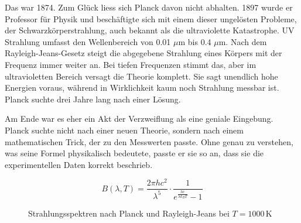 	Das war 1874. 
	Zum Glück liess sich Planck davon nicht abhalten.
	1897 wurde er Professor für Physik und beschäftigte sich mit einem dieser ungelösten Probleme, der Schwarzkörperstrahlung, auch bekannt als die ultraviolette Katastrophe. 
	UV Strahlung umfasst den Wellenbereich von 0.01 $\mu$m bis 0.4 $\mu$m.
	Nach dem Rayleigh-Jeans-Gesetz steigt die abgegebene Strahlung eines Körpers mit der Frequenz immer weiter an. Bei tiefen Frequenzen stimmt das, aber im ultravioletten Bereich versagt die Theorie komplett. 
	Sie sagt unendlich hohe Energien voraus, während in Wirklichkeit kaum noch Strahlung messbar ist.
	Planck suchte drei Jahre lang nach einer Lösung. 
	
	
	Am Ende war es eher ein Akt der Verzweiflung als eine geniale Eingebung. 
	Planck suchte nicht nach einer neuen Theorie, sondern nach einem mathematischen Trick, der zu den Messwerten passte.
	Ohne genau zu verstehen, was seine Formel physikalisch bedeutete, passte er sie so an, dass sie die experimentellen Daten korrekt beschrieb. 


	\begin{equation}
		B(\lambda, T) = \frac{2 \pi h c^2}{\lambda^5} \cdot \frac{1}{e^{\frac{h c}{\lambda k_B T}} - 1}
	\end{equation}
	


		
	\begin{figure}[htbp]
		\centering
		\caption{Strahlungsspektren nach Planck und Rayleigh-Jeans bei $T=1000\,\mathrm{K}$}
	\end{figure}
		

